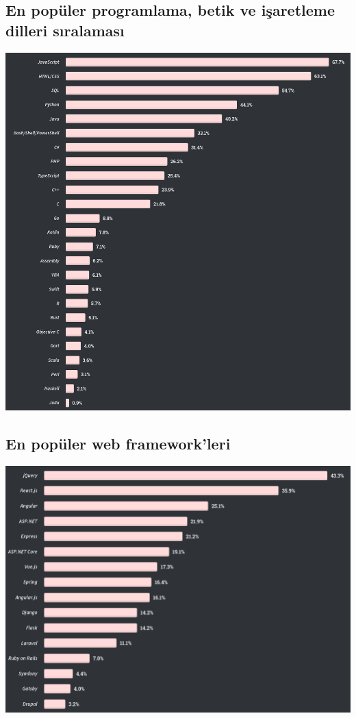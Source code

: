 \documentclass[11pt]{article}
\begin{document}
\subsection{En popüler programlama, betik ve işaretleme dilleri sıralaması}
\label{sec:orgb9b066d}
\begin{center}
\includegraphics[width=.9\linewidth]{gorseller/stackoverflow-2020-populer-diller.png}
\end{center}
\subsection{En popüler web framework'leri}
\label{sec:org021837b}
\begin{center}
\includegraphics[width=.9\linewidth]{gorseller/stackoverflow-2020-web-frameworks.png}
\end{center}
\end{document}
